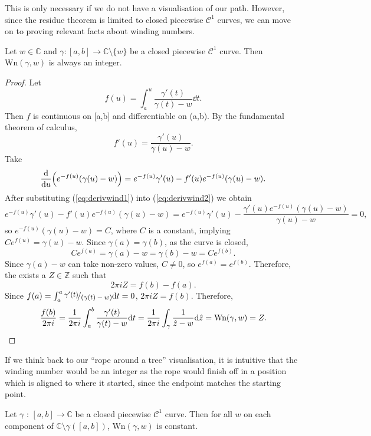 \documentclass[a4paper]{article}
\def\nicefrac#1#2{%
    \raise.5ex\hbox{\begin{footnotesize}$#1$\end{footnotesize}}%
    \kern-.15em/\kern-.035em%
    \lower.25ex\hbox{\begin{footnotesize}$#2$\end{footnotesize}}}
\def\Wind{\text{Wn}}
\begin{document}
This is only necessary if we do not have a visualisation of our path. However, since the residue theorem is limited to closed piecewise $\mathcal{C}^1$ curves, we can move on to proving relevant facts about winding numbers.

\newpage
\begin{proposition}{\citep[p.348]{Princeton}}{}
Let $w \in \mathbb{C}$ and $\gamma: [a,b] \rightarrow \mathbb{C} \setminus \{w\}$ be a closed piecewise $\mathcal{C}^{1}$ curve. Then $\Wind (\gamma,w)$ is always an integer. 
\end{proposition}


\begin{proof}
Let
\[ f(u) = \int_a^u { \frac{\gamma'(t)}{\gamma(t)-w} \dd t}.\]
Then $f$ is continuous on [a,b] and differentiable on (a,b). By the fundamental theorem of calculus,
\begin{equation}\label{eq:derivwind1}
f'(u) =  \frac{\gamma'(u)}{\gamma(u)-w}.
\end{equation}
Take
\begin{equation}\label{eq:derivwind2}
\dv{u} (e^{-f(u)}(\gamma(u)-w)) = e^{-f(u)}\gamma'(u) - f'(u)e^{-f(u)}(\gamma(u)-w).
\end{equation}
After substituting (\ref{eq:derivwind1}) into (\ref{eq:derivwind2}) we obtain
\[e^{-f(u)}\gamma'(u) - f'(u)e^{-f(u)}(\gamma(u)-w) = e^{-f(u)}\gamma'(u) - \frac{\gamma'(u)e^{-f(u)}(\gamma(u)-w)}{\gamma(u)-w}=0,\]
so $e^{-f(u)}(\gamma(u)-w) = C$, where $C$ is a constant, implying $Ce^{f(u)} = \gamma(u)-w.$
Since $\gamma(a) = \gamma(b)$, as the curve is closed,
\[ Ce^{f(a)} = \gamma(a)-w = \gamma(b)-w = Ce^{f(b)}.\]
Since $\gamma(a)-w$ can take non-zero values, $C \neq 0$, so $e^{f(a)}=e^{f(b)}$. Therefore, the exists a $Z \in \mathbb{Z}$ such that
\[2\pi i Z = f(b) - f(a).\]
Since $f(a) = \int_a^a { \nicefrac{\gamma'(t)}{(\gamma(t)-w)} \dd t} = 0$, $2\pi i Z = f(b)$. Therefore,
\[\frac{f(b)}{2\pi i } = \frac{1}{2\pi i }\int_a^b { \frac{\gamma'(t)}{\gamma(t)-w} \dd t} = \frac{1}{2\pi i }\int_\gamma { \frac{1}{\hat{z}-w} \dd \hat{z}} =\Wind (\gamma,w) = Z. \qedhere\]
\end{proof}

If we think back to our ``rope around a tree'' visualisation, it is intuitive that the winding number would be an integer as the rope would finish off in a position which is aligned to where it started, since the endpoint matches the starting point. 

\begin{corollary}{}{} \label{thm:constantwind}
Let $\gamma$ : $[a,b] \rightarrow \mathbb{C}$ be a closed piecewise $\mathcal{C}^{1}$ curve. Then for all $w$ on each component of $\mathbb{C} \setminus \gamma([a,b])$, $\Wind (\gamma, w)$ is constant.
\end{corollary}
\end{document}
